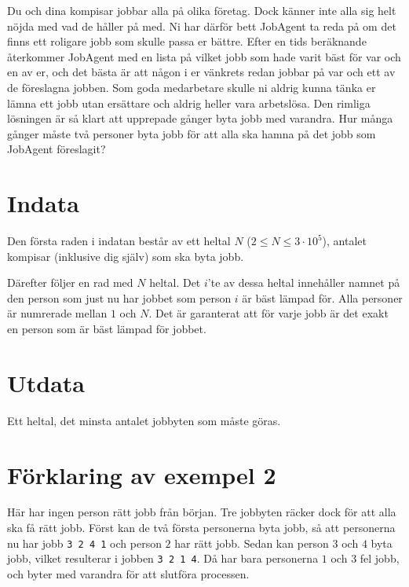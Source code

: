 Du och dina kompisar jobbar alla på olika företag. 
Dock känner inte alla sig helt nöjda med vad de håller på med. 
Ni har därför bett JobAgent ta reda på om det finns ett roligare jobb som skulle passa er bättre.
Efter en tids beräknande återkommer JobAgent med en lista på vilket jobb som hade varit bäst för var och en av er, och det bästa är att någon i er vänkrets redan jobbar på var och ett av de föreslagna jobben. 
Som goda medarbetare skulle ni aldrig kunna tänka er lämna ett jobb utan ersättare och aldrig heller vara arbetslösa.
Den rimliga lösningen är så klart att upprepade gånger byta jobb med varandra.
Hur många gånger måste två personer byta jobb för att alla ska hamna på det jobb som JobAgent föreslagit?

\section*{Indata}
Den första raden i indatan består av ett heltal $N$ ($2 \le N \le 3\cdot10^5$), antalet kompisar (inklusive dig själv) som ska byta jobb.

Därefter följer en rad med $N$ heltal.
Det $i$'te av dessa heltal innehåller namnet på den person som just nu har jobbet som person $i$ är bäst lämpad för.
Alla personer är numrerade mellan $1$ och $N$.
Det är garanterat att för varje jobb är det exakt en person som är bäst lämpad för jobbet.

\section*{Utdata}
Ett heltal, det minsta antalet jobbyten som måste göras. 

\section*{Förklaring av exempel 2}
Här har ingen person rätt jobb från början.
Tre jobbyten räcker dock för att alla ska få rätt jobb.
Först kan de två första personerna byta jobb, så att personerna nu har jobb \texttt{3 2 4 1} och person $2$ har rätt jobb.
Sedan kan person $3$ och $4$ byta jobb, vilket resulterar i jobben \texttt{3 2 1 4}.
Då har bara personerna $1$ och $3$ fel jobb, och byter med varandra för att slutföra processen.
